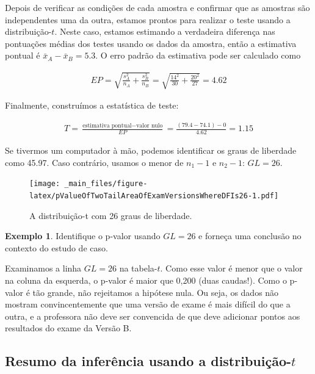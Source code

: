 \documentclass[
]{book}
\theoremstyle{definition}
\theoremstyle{definition}
\newtheorem{example}{Exemplo}[chapter]
\theoremstyle{definition}
\theoremstyle{definition}
\theoremstyle{remark}
\begin{document}
Depois de verificar as condições de cada amostra e confirmar que as amostras são independentes uma da outra, estamos prontos para realizar o teste usando a distribuição-\(t\). Neste caso, estamos estimando a verdadeira diferença nas pontuações médias dos testes usando os dados da amostra, então a estimativa pontual é \(\bar{x}_A - \bar{x}_B = 5.3\). O erro padrão da estimativa pode ser calculado como

\begin{eqnarray*}
EP = \sqrt{\frac{s_A^2}{n_A} + \frac{s_B^2}{n_B}} = \sqrt{\frac{14^2}{30} + \frac{20^2}{27}} = 4.62
\end{eqnarray*}

Finalmente, construímos a estatística de teste:

\begin{eqnarray*}
T = \frac{\text{estimativa pontual} - \text{valor nulo}}{EP} = \frac{(79.4-74.1) - 0}{4.62} = 1.15
\end{eqnarray*}

Se tivermos um computador à mão, podemos identificar os graus de liberdade como 45.97. Caso contrário, usamos o menor de \(n_1-1\) e \(n_2-1\): \(GL=26\).

\begin{figure}
\centering
\texttt{[image: \_main\_files/figure-latex/pValueOfTwoTailAreaOfExamVersionsWhereDFIs26-1.pdf]}
\caption{\label{fig:pValueOfTwoTailAreaOfExamVersionsWhereDFIs26}A distribuição-t com 26 graus de liberdade.}
\end{figure}

\begin{example}
\protect\hypertarget{exm:unnamed-chunk-205}{}{\label{exm:unnamed-chunk-205} }Identifique o p-valor usando \(GL = 26\) e forneça uma conclusão no contexto do estudo de caso.
\end{example}

Examinamos a linha \(GL = 26\) na tabela-\(t\). Como esse valor é menor que o valor na coluna da esquerda, o p-valor é maior que 0,200 (duas caudas!). Como o p-valor é tão grande, não rejeitamos a hipótese nula. Ou seja, os dados não mostram convincentemente que uma versão de exame é mais difícil do que a outra, e a professora não deve ser convencida de que deve adicionar pontos aos resultados do exame da Versão B.

\hypertarget{inferenceSummaryTDistribution}{%
\subsection{\texorpdfstring{Resumo da inferência usando a distribuição-\(t\)}{Resumo da inferência usando a distribuição-t}}\label{inferenceSummaryTDistribution}}
\end{document}
